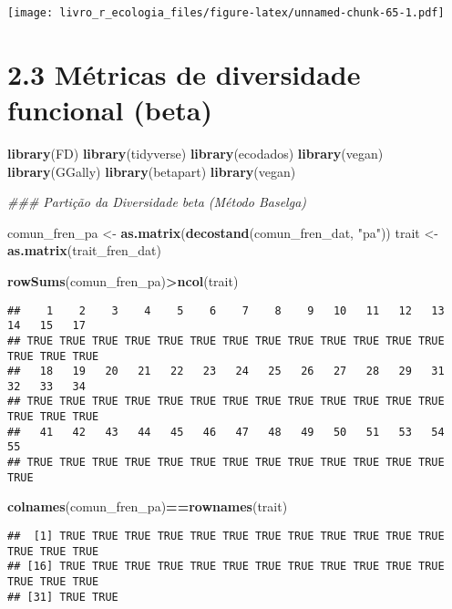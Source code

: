 \documentclass[
]{book}
\newenvironment{Shaded}{\begin{snugshade}}{\end{snugshade}}
\newcommand{\CommentTok}[1]{\textcolor[rgb]{0.56,0.35,0.01}{\textit{#1}}}
\newcommand{\KeywordTok}[1]{\textcolor[rgb]{0.13,0.29,0.53}{\textbf{#1}}}
\newcommand{\NormalTok}[1]{#1}
\newcommand{\OperatorTok}[1]{\textcolor[rgb]{0.81,0.36,0.00}{\textbf{#1}}}
\newcommand{\StringTok}[1]{\textcolor[rgb]{0.31,0.60,0.02}{#1}}
\begin{document}
\texttt{[image: livro\_r\_ecologia\_files/figure-latex/unnamed-chunk-65-1.pdf]}

\hypertarget{muxe9tricas-de-diversidade-funcional-beta}{%
\section{2.3 Métricas de diversidade funcional (beta)}\label{muxe9tricas-de-diversidade-funcional-beta}}

\begin{Shaded}
\begin{Highlighting}[]
\KeywordTok{library}\NormalTok{(FD)}
\KeywordTok{library}\NormalTok{(tidyverse)}
\KeywordTok{library}\NormalTok{(ecodados)}
\KeywordTok{library}\NormalTok{(vegan)}
\KeywordTok{library}\NormalTok{(GGally)}
\KeywordTok{library}\NormalTok{(betapart)}
\KeywordTok{library}\NormalTok{(vegan)}

\CommentTok{### Partição da Diversidade beta (Método Baselga)}

\NormalTok{comun_fren_pa <-}\StringTok{ }\KeywordTok{as.matrix}\NormalTok{(}\KeywordTok{decostand}\NormalTok{(comun_fren_dat, }\StringTok{"pa"}\NormalTok{))}
\NormalTok{trait <-}\StringTok{ }\KeywordTok{as.matrix}\NormalTok{(trait_fren_dat)}
 
\KeywordTok{rowSums}\NormalTok{(comun_fren_pa)}\OperatorTok{>}\KeywordTok{ncol}\NormalTok{(trait)}
\end{Highlighting}
\end{Shaded}

\begin{verbatim}
##    1    2    3    4    5    6    7    8    9   10   11   12   13   14   15   17 
## TRUE TRUE TRUE TRUE TRUE TRUE TRUE TRUE TRUE TRUE TRUE TRUE TRUE TRUE TRUE TRUE 
##   18   19   20   21   22   23   24   25   26   27   28   29   31   32   33   34 
## TRUE TRUE TRUE TRUE TRUE TRUE TRUE TRUE TRUE TRUE TRUE TRUE TRUE TRUE TRUE TRUE 
##   41   42   43   44   45   46   47   48   49   50   51   53   54   55 
## TRUE TRUE TRUE TRUE TRUE TRUE TRUE TRUE TRUE TRUE TRUE TRUE TRUE TRUE
\end{verbatim}

\begin{Shaded}
\begin{Highlighting}[]
\KeywordTok{colnames}\NormalTok{(comun_fren_pa)}\OperatorTok{==}\KeywordTok{rownames}\NormalTok{(trait)}
\end{Highlighting}
\end{Shaded}

\begin{verbatim}
##  [1] TRUE TRUE TRUE TRUE TRUE TRUE TRUE TRUE TRUE TRUE TRUE TRUE TRUE TRUE TRUE
## [16] TRUE TRUE TRUE TRUE TRUE TRUE TRUE TRUE TRUE TRUE TRUE TRUE TRUE TRUE TRUE
## [31] TRUE TRUE
\end{verbatim}
\end{document}
